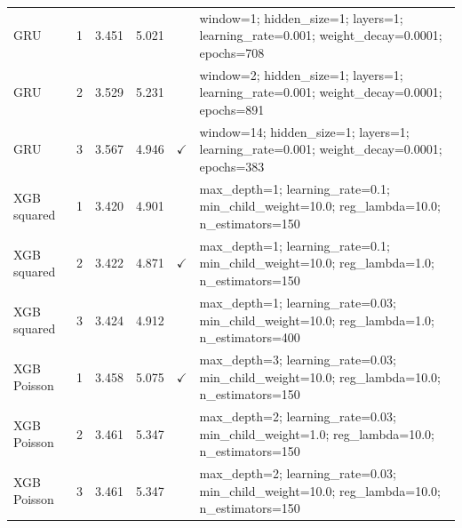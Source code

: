 \begin{tabular}{@{}llcccp{11.4cm}@{}}
GRU & 1 & 3.451 & 5.021 &  & window=1; hidden\_size=1; layers=1; learning\_rate=0.001; weight\_decay=0.0001; epochs=708 \\
GRU & 2 & 3.529 & 5.231 &  & window=2; hidden\_size=1; layers=1; learning\_rate=0.001; weight\_decay=0.0001; epochs=891 \\
GRU & 3 & 3.567 & 4.946 & $\checkmark$ & window=14; hidden\_size=1; layers=1; learning\_rate=0.001; weight\_decay=0.0001; epochs=383 \\
XGB squared & 1 & 3.420 & 4.901 &  & max\_depth=1; learning\_rate=0.1; min\_child\_weight=10.0; reg\_lambda=10.0; n\_estimators=150 \\
XGB squared & 2 & 3.422 & 4.871 & $\checkmark$ & max\_depth=1; learning\_rate=0.1; min\_child\_weight=10.0; reg\_lambda=1.0; n\_estimators=150 \\
XGB squared & 3 & 3.424 & 4.912 &  & max\_depth=1; learning\_rate=0.03; min\_child\_weight=10.0; reg\_lambda=1.0; n\_estimators=400 \\
XGB Poisson & 1 & 3.458 & 5.075 & $\checkmark$ & max\_depth=3; learning\_rate=0.03; min\_child\_weight=10.0; reg\_lambda=10.0; n\_estimators=150 \\
XGB Poisson & 2 & 3.461 & 5.347 &  & max\_depth=2; learning\_rate=0.03; min\_child\_weight=1.0; reg\_lambda=10.0; n\_estimators=150 \\
XGB Poisson & 3 & 3.461 & 5.347 &  & max\_depth=2; learning\_rate=0.03; min\_child\_weight=10.0; reg\_lambda=10.0; n\_estimators=150 \\
\bottomrule
\end{tabular}
